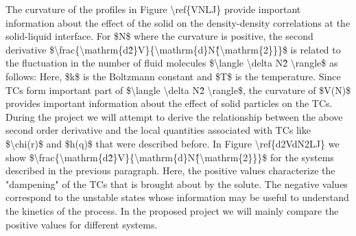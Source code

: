\par The curvature of the profiles in Figure \textbackslash ref\{VNLJ\} provide important information about the effect of the solid on the density-density correlations at the solid-liquid interface. For \$N\$ where the curvature is positive, the second derivative \$\textbackslash frac\{\textbackslash mathrm\{d\^2\}V\}\{\textbackslash mathrm\{d\}N\^\{\textbackslash mathrm\{2\}\}\}\$ is related to the fluctuation in the number of fluid molecules \$\textbackslash langle \textbackslash delta N\^2 \textbackslash rangle\$ as follows: Here, \$k\$ is the Boltzmann constant and \$T\$ is the temperature. Since TCs form important part of \$\textbackslash langle \textbackslash delta N\^2 \textbackslash rangle\$, the curvature of \$V(N)\$ provides important information about the effect of solid particles on the TCs. During the project we will attempt to derive the relationship between the above second order derivative and the local quantities associated with TCs like \$\textbackslash chi(r)\$ and \$h(q)\$ that were described before. In Figure \textbackslash ref\{d2VdN2LJ\} we show \$\textbackslash frac\{\textbackslash mathrm\{d\^2\}V\}\{\textbackslash mathrm\{d\}N\^\{\textbackslash mathrm\{2\}\}\}\$ for the systems described in the previous paragraph. Here, the positive values  characterize the "dampening" of the TCs that is brought about by the solute. The negative values correspond to the unstable states whose information may be useful to understand the kinetics of the process. In the proposed project we will mainly compare the positive values for different systems.
